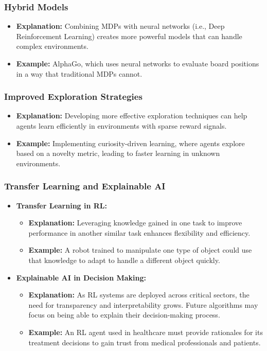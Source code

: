 \documentclass[aspectratio=169]{beamer}
\begin{document}
\begin{frame}[fragile]
    \frametitle{Hybrid Models}
    \begin{itemize}
        \item \textbf{Explanation:} Combining MDPs with neural networks (i.e., Deep Reinforcement Learning) creates more powerful models that can handle complex environments.
        \item \textbf{Example:} AlphaGo, which uses neural networks to evaluate board positions in a way that traditional MDPs cannot.
    \end{itemize}
\end{frame}

\begin{frame}[fragile]
    \frametitle{Improved Exploration Strategies}
    \begin{itemize}
        \item \textbf{Explanation:} Developing more effective exploration techniques can help agents learn efficiently in environments with sparse reward signals.
        \item \textbf{Example:} Implementing curiosity-driven learning, where agents explore based on a novelty metric, leading to faster learning in unknown environments.
    \end{itemize}
\end{frame}

\begin{frame}[fragile]
    \frametitle{Transfer Learning and Explainable AI}
    \begin{itemize}
        \item \textbf{Transfer Learning in RL:}
        \begin{itemize}
            \item \textbf{Explanation:} Leveraging knowledge gained in one task to improve performance in another similar task enhances flexibility and efficiency.
            \item \textbf{Example:} A robot trained to manipulate one type of object could use that knowledge to adapt to handle a different object quickly.
        \end{itemize}
        
        \item \textbf{Explainable AI in Decision Making:}
        \begin{itemize}
            \item \textbf{Explanation:} As RL systems are deployed across critical sectors, the need for transparency and interpretability grows. Future algorithms may focus on being able to explain their decision-making process.
            \item \textbf{Example:} An RL agent used in healthcare must provide rationales for its treatment decisions to gain trust from medical professionals and patients.
        \end{itemize}
    \end{itemize}
\end{frame}
\end{document}
